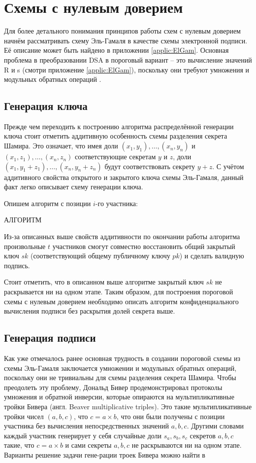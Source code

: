 \documentclass[a4paper,12pt]{article}
\theoremstyle{definition}
\begin{document}
	
	\section{Схемы с нулевым доверием}
	
	Для более детального понимания принципов работы схем с нулевым доверием начнём рассматривать схему Эль-Гамаля в качестве схемы электронной подписи. Её описание может быть найдено в приложении \ref{applic:ElGam}. Основная проблема в преобразовании DSA в пороговый вариант – это вычисление значений R и s (смотри приложение \ref{applic:ElGam}), поскольку они требуют умножения и модульных обратных операций \cite{paper3}.
	
		\subsection{Генерация ключа}
		
		Прежде чем переходить к построению алгоритма распределённой генерации ключа стоит отметить аддитивную особенность схемы разделения секрета Шамира. Это означает, что имея доли $(x_1, y_1), \dots,  (x_n, y_n)$ и $(x_1, z_1), \dots,  (x_n, z_n)$ соответствующие секретам $y$ и $z$, доли $(x_1, y_1+z_1), \dots,  (x_n, y_n+z_n)$ будут соответствовать секрету $y+z$. С учётом аддитивного свойства открытого и закрытого ключа схемы Эль-Гамаля, данный факт легко описывает схему генерации ключа.
		
		Опишем алгоритм с позиции $i$-го участника:
		
		АЛГОРИТМ
		
		Из-за описанных выше свойств аддитивности по окончании работы алгоритма произвольные $t$ участников смогут совместно восстановить общий закрытый ключ $sk$ (соответствующий общему публичному ключу $pk$) и сделать валидную подпись. 
		
		Стоит отметить, что в описанном выше алгоритме закрытый ключ $sk$ не раскрывается ни на одном этапе. Таким образом, для построения пороговой схемы с нулевым доверием необходимо описать алгоритм конфиденциального вычисления подписи без раскрытия долей секрета выше.
		
		
		\subsection{Генерация подписи}
		
		Как уже отмечалось ранее основная трудность в создании пороговой схемы из схемы Эль-Гамаля заключается умножении и модульных обратных операций, поскольку они не тривиальны для схемы разделения секрета Шамира. Чтобы преодолеть эту проблему, Дональд Бивер продемонстрировал \cite{paper4} \cite{paper5} протоколы умножения и обратной инверсии, которые опираются на мультипликативные тройки Бивера (англ. Beaver multiplicative triples). Это такие мультипликативные тройки чисел $(a, b, c)$, что $c=a\times b$, что они были получены с позиции участника без вычисления непосредственных значений $a, b, c$. Другими словами каждый участник генерирует у себя случайные доли $s_a, s_b, s_c$ секретов $a, b, c$ такие, что $c=a\times b$ и сами секреты $a, b, c$ не раскрываются ни на одном этапе. Варианты решение задачи гене-рации троек Бивера можно найти в \cite{paper6}
		
\end{document}
